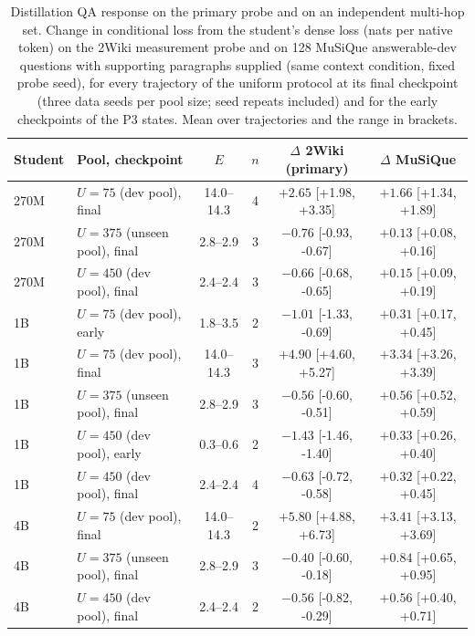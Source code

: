 \begin{table}[H]
\centering\small
\caption{Distillation QA response on the primary probe and on an independent multi-hop set. Change in conditional loss from the student's dense loss (nats per native token) on the 2Wiki measurement probe and on 128 MuSiQue answerable-dev questions with supporting paragraphs supplied (same context condition, fixed probe seed), for every trajectory of the uniform protocol at its final checkpoint (three data seeds per pool size; seed repeats included) and for the early checkpoints of the P3 states. Mean over trajectories and the range in brackets.}
\label{tab:musique_scope}
\begin{tabular}{llcccc}
\toprule
Student & Pool, checkpoint & $E$ & $n$ & $\Delta$ 2Wiki (primary) & $\Delta$ MuSiQue \\
\midrule
270M & $U{=}75$ (dev pool), final & 14.0--14.3 & 4 & $+2.65$ [+1.98, +3.35] & $+1.66$ [+1.34, +1.89] \\
270M & $U{=}375$ (unseen pool), final & 2.8--2.9 & 3 & $-0.76$ [-0.93, -0.67] & $+0.13$ [+0.08, +0.16] \\
270M & $U{=}450$ (dev pool), final & 2.4--2.4 & 3 & $-0.66$ [-0.68, -0.65] & $+0.15$ [+0.09, +0.19] \\
1B & $U{=}75$ (dev pool), early & 1.8--3.5 & 2 & $-1.01$ [-1.33, -0.69] & $+0.31$ [+0.17, +0.45] \\
1B & $U{=}75$ (dev pool), final & 14.0--14.3 & 3 & $+4.90$ [+4.60, +5.27] & $+3.34$ [+3.26, +3.39] \\
1B & $U{=}375$ (unseen pool), final & 2.8--2.9 & 3 & $-0.56$ [-0.60, -0.51] & $+0.56$ [+0.52, +0.59] \\
1B & $U{=}450$ (dev pool), early & 0.3--0.6 & 2 & $-1.43$ [-1.46, -1.40] & $+0.33$ [+0.26, +0.40] \\
1B & $U{=}450$ (dev pool), final & 2.4--2.4 & 4 & $-0.63$ [-0.72, -0.58] & $+0.32$ [+0.22, +0.45] \\
4B & $U{=}75$ (dev pool), final & 14.0--14.3 & 2 & $+5.80$ [+4.88, +6.73] & $+3.41$ [+3.13, +3.69] \\
4B & $U{=}375$ (unseen pool), final & 2.8--2.9 & 3 & $-0.40$ [-0.60, -0.18] & $+0.84$ [+0.65, +0.95] \\
4B & $U{=}450$ (dev pool), final & 2.4--2.4 & 2 & $-0.56$ [-0.82, -0.29] & $+0.56$ [+0.40, +0.71] \\
\bottomrule
\end{tabular}
\end{table}
